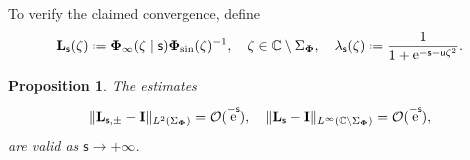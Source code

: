 \documentclass[reqno,a4paper,11pt]{amsart}
\DeclareMathOperator{\ee}{\rm e}
\newcommand{\C}{\mathbb{C}}
\newcommand{\Boh}{\mathcal{O}}
\newcommand*{\deff}{\mathrel{\vcenter{\baselineskip0.5ex \lineskiplimit0pt
                     \hbox{\scriptsize.}\hbox{\scriptsize.}}}%
                     =}
\renewcommand{\bm}{\mathbf}
\newcommand{\msf}{\mathsf}
\newcommand{\sad}{\msf s}
\newcommand{\uad}{\msf u}
\newtheorem{prop}[theorem]{Proposition}
\theoremstyle{definition}
\theoremstyle{remark}
\numberwithin{equation}{section}
\newcommand*{\defeq}{\mathrel{\vcenter{\baselineskip0.5ex \lineskiplimit0pt
                     \hbox{\scriptsize.}\hbox{\scriptsize.}}}%
                     =}
\begin{document}
    To verify the claimed convergence, define
%
\begin{equation}\label{eq:transfLsPhiinfty}
    \bm L_{\sad} (\zeta)\deff \bm \Phi_\infty(\zeta\mid \sad)\bm\Phi_{\sin}(\zeta)^{-1},\quad \zeta\in \C\setminus \Sigma_{\bm \Phi}, \quad
%
    \lambda_{ \sad}(\zeta) \defeq \frac{1}{1 + \ee^{- \sad - \uad \zeta^2}}.
\end{equation}

\begin{prop}\label{prop:estimatesAsymptotics1}
    The estimates
    \[
        \| \bm L_{\sad, \pm} - \bm I \|_{L^2(\Sigma_{\bm \Phi})} = \Boh(\ee^{- \sad}), \quad
        \| \bm L_{\sad} - \bm I \|_{L^\infty \left( \C \setminus \Sigma_{\bm \Phi}\right)} = \Boh(\ee^{- \sad}),
    \]
    are valid as $\sad \to +\infty$.
\end{prop}
\end{document}
